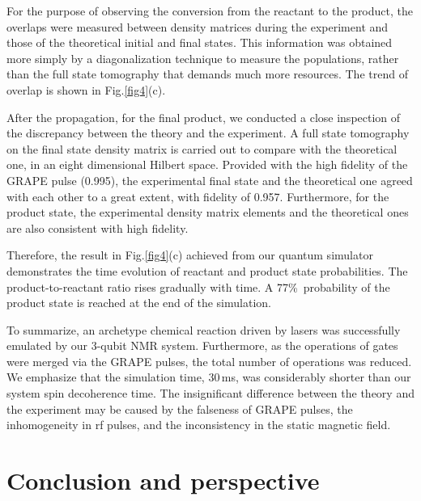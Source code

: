 \documentclass[8.5pt,twoside,twocolumn]{article}
\begin{document}
For the purpose of observing the conversion from the reactant to
the product, the overlaps were measured between density matrices
during the experiment and those of the theoretical initial and final states.
This information was obtained
more simply by a diagonalization technique\cite{NMR_dynamic}
to measure the populations,
rather than the full state tomography
that demands much more resources.
The trend of overlap is shown in Fig.\ref{fig4}(c).

After the propagation, for the final product, we conducted
a close inspection of the discrepancy between the theory
and the experiment.
A full state tomography on the final state density matrix
is carried out to compare with the theoretical one,
in an eight dimensional Hilbert space.
Provided with the high fidelity of the GRAPE pulse (0.995),
the experimental final state and the theoretical one
agreed with each other to a great extent,
with fidelity of 0.957.
Furthermore, for the product state,
the experimental density matrix elements
and the theoretical ones are also consistent with high fidelity.

Therefore, the result in Fig.\ref{fig4}(c) achieved
from our quantum simulator demonstrates the time evolution of
reactant and product state probabilities.
The product-to-reactant ratio
rises gradually with time. A 77\%\ probability of
the product state is reached at the end of the simulation.

To summarize, an archetype chemical reaction driven by lasers
was successfully emulated by our 3-qubit NMR system.
Furthermore, as the operations of gates were merged via the GRAPE pulses,
the total number of operations was reduced.
We emphasize that the simulation time, 30\,ms, was considerably
shorter than our system spin decoherence time.
The insignificant difference
between the theory and the experiment may be caused by
the falseness of GRAPE pulses,
the inhomogeneity in rf pulses,
and the inconsistency in the static magnetic field.

\section{Conclusion and perspective}
\end{document}

